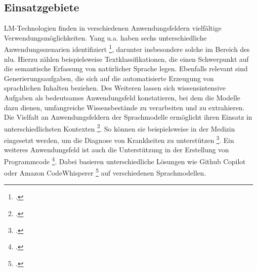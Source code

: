 \subsection{Einsatzgebiete} \label{sec:einsatzgebiete}
LM-Technologien finden in verschiedenen Anwendungsfeldern vielfältige Verwendungsmöglichkeiten. Yang u.a. haben sechs unterschiedliche Anwendungsszenarien identifiziert \footcite[Vgl.][S. 6 ff.]{yang2023harnessing}, darunter insbesondere solche im Bereich des \ac{nlu}. Hierzu zählen beispielsweise Textklassifikationen, die einen Schwerpunkt auf die semantische Erfassung von natürlicher Sprache legen. Ebenfalls relevant sind Generierungsaufgaben, die sich auf die automatisierte Erzeugung von sprachlichen Inhalten beziehen. Des Weiteren lassen sich wissensintensive Aufgaben als bedeutsames Anwendungsfeld konstatieren, bei dem die Modelle dazu dienen, umfangreiche Wissensbestände zu verarbeiten und zu extrahieren.
Die Vielfalt an Anwendungsfeldern der Sprachmodelle ermöglicht ihren Einsatz in unterschiedlichsten Kontexten \footcite[Vgl.][S. 6 ff.]{yang2023harnessing}.
So können sie beispielsweise in der Medizin eingesetzt werden, um die Diagnose von Krankheiten zu unterstützen \footcite[Vgl.][S. 10 ff.]{Peng_2023}.
Ein weiteres Anwendungsfeld ist auch die Unterstützung in der Erstellung von Programmcode \footcite[Vgl.][S. 3 ff.]{yetiştiren2023evaluating}.
Dabei basieren unterschiedliche Lösungen wie Github Copilot oder Amazon CodeWhisperer \footcite[Vgl.][S. 1]{MORADIDAKHEL2023111734} auf verschiedenen Sprachmodellen.

